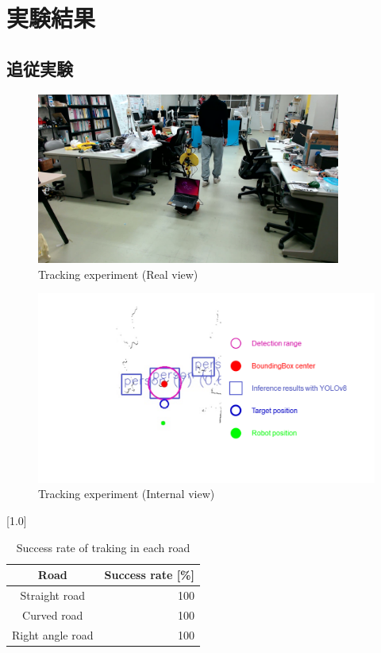 \section{実験結果}
\subsection{追従実験}
\begin{figure}[h]
  \begin{center}
  \includegraphics[width=100mm,clip]{figure/Tracking-experiment-Real-view.jpg}
  \caption{Tracking experiment (Real view)}
  \label{Tracking experiment (Real view)}
  \end{center}
\end{figure}

\begin{figure}[h]
  \begin{center}
  \includegraphics[width=170mm,clip]{figure/Tracking-experiment-Internal-view.png}
  \caption{Tracking experiment (Internal view)}
  \label{Tracking experiment (Internal view)}
  \end{center}
\end{figure}

\begin{table}[h]
    \begin{center}
      \caption{{Success rate of traking in each road}\label{Success rate of traking in each road}}
      \scalebox{1.2}[1.0]{
        \begin{tabular}{c|r} \hline
          Road & Success rate [\%] \\ \hline
          Straight road & 100 \\
          Curved road & 100 \\
          Right angle road & 100 \\ \hline
        \end{tabular}
      }
    \end{center}
\end{table}

